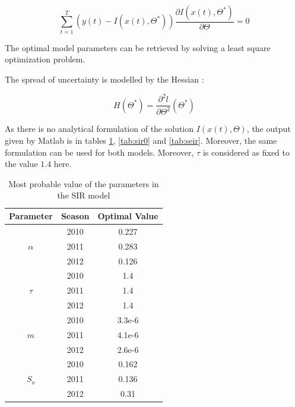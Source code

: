 \documentclass[11pt, a4paper]{article}
\begin{document}
\begin{equation}
\sum_{t=1}^T (y(t) - I(x(t), \Theta^*)) \frac{\partial I(x(t), \Theta^*)}{\partial \Theta} = 0
\end{equation}

The optimal model parameters can be retrieved by solving a least square optimization problem. 

The spread of uncertainty is modelled by the Hessian :

\begin{equation}
H(\Theta^*) = \frac{\partial^2 l}{\partial \Theta^2} (\Theta^*) 
\end{equation}

As there is no analytical formulation of the solution $I(x(t), \Theta)$, the output given by Matlab is in tables \ref{tab:sir}, \ref{tab:sir0} and \ref{tab:seir}. Moreover, the same formulation can be used for both models. Moreover, $\tau$ is considered as fixed to the value $1.4$ here.

\begin{table}[H]
\FloatBarrier
\centering
\begin{tabular}{| c | c | c |}
    \hline
    Parameter & Season & Optimal Value \\ \hline
    \multirow{3}{*}{$\alpha$} & 2010 & 0.227\\
    & 2011 & 0.283\\
    & 2012 & 0.126 \\ \hline
    \multirow{3}{*}{$\tau$} & 2010 & 1.4 \\ 
    & 2011 & 1.4\\
    & 2012 & 1.4\\ \hline
    \multirow{3}{*}{$m$} & 2010 & 3.3e-6\\ 
    & 2011 & 4.1e-6 \\
    & 2012 & 2.6e-6 \\ \hline
    \multirow{3}{*}{$S_o$} & 2010 & 0.162 \\ 
    & 2011 & 0.136 \\ 
    & 2012 & 0.31 \\ \hline
    \end{tabular}
    \caption{Most probable value of the parameters in the SIR model}
    \label{tab:sir}
\end{table}
\end{document}
